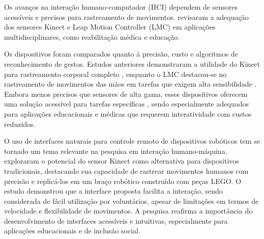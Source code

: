 Os avanços na interação humano-computador (HCI) dependem de sensores acessíveis e precisos para rastreamento de movimentos. \citep{guzsvinecz2019suitability} revisaram a adequação dos sensores Kinect e Leap Motion Controller (LMC) em aplicações multidisciplinares, como reabilitação médica e educação.

Os dispositivos foram comparados quanto à precisão, custo e algoritmos de reconhecimento de gestos. Estudos anteriores demonstraram a utilidade do Kinect para rastreamento corporal completo \citep{redaelli2021comparison}, enquanto o LMC destacou-se no rastreamento de movimentos das mãos em tarefas que exigem alta sensibilidade \citep{weichert2013analysis}. Embora menos precisos que sensores de alta gama, esses dispositivos oferecem uma solução acessível para tarefas específicas \citep{guzsvinecz2019suitability}, sendo especialmente adequados para aplicações educacionais e médicas que requerem interatividade com custos reduzidos.

O uso de interfaces naturais para controle remoto de dispositivos robóticos tem se tornado um tema relevante na pesquisa em interação humano-máquina. \citep{moura2016estudos} exploraram o potencial do sensor Kinect como alternativa para dispositivos tradicionais, destacando sua capacidade de rastrear movimentos humanos com precisão e replicá-los em um braço robótico construído com peças LEGO.
O estudo demonstrou que a interface proposta facilita a interação, sendo considerada de fácil utilização por voluntários, apesar de limitações em termos de velocidade e flexibilidade de movimentos. A pesquisa reafirma a importância do desenvolvimento de interfaces acessíveis e intuitivas, especialmente para aplicações educacionais e de inclusão social.


